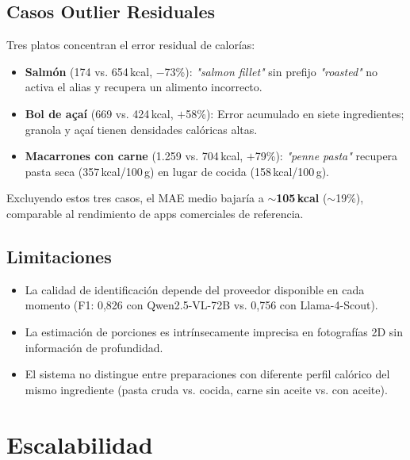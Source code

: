 \documentclass[10pt,a4paper]{article}
\begin{document}
\subsection{Casos Outlier Residuales}

Tres platos concentran el error residual de calorías:

\begin{itemize}[noitemsep, topsep=2pt]
  \item \textbf{Salmón} (174 vs. 654\,kcal, $-$73\%): \textit{"salmon fillet"} sin prefijo
        \textit{"roasted"} no activa el alias y recupera un alimento incorrecto.
  \item \textbf{Bol de açaí} (669 vs. 424\,kcal, $+$58\%): Error acumulado en siete ingredientes;
        granola y açaí tienen densidades calóricas altas.
  \item \textbf{Macarrones con carne} (1.259 vs. 704\,kcal, $+$79\%): \textit{"penne pasta"}
        recupera pasta seca (357\,kcal/100\,g) en lugar de cocida (158\,kcal/100\,g).
\end{itemize}

Excluyendo estos tres casos, el MAE medio bajaría a $\sim$\textbf{105\,kcal} ($\sim$19\%), comparable
al rendimiento de apps comerciales de referencia.

\subsection{Limitaciones}

\begin{itemize}[noitemsep, topsep=2pt]
  \item La calidad de identificación depende del proveedor disponible en cada momento (F1: 0,826
        con Qwen2.5-VL-72B vs. 0,756 con Llama-4-Scout).
  \item La estimación de porciones es intrínsecamente imprecisa en fotografías 2D sin información
        de profundidad.
  \item El sistema no distingue entre preparaciones con diferente perfil calórico del mismo
        ingrediente (pasta cruda vs. cocida, carne sin aceite vs. con aceite).
\end{itemize}

\section{Escalabilidad}
\end{document}
